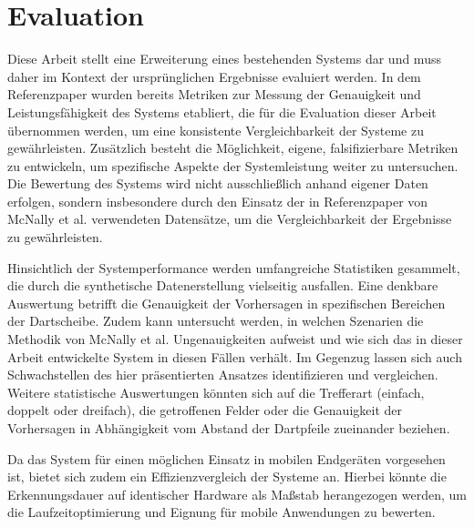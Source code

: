 \section{Evaluation}
\label{sec:evaluation}

Diese Arbeit stellt eine Erweiterung eines bestehenden Systems dar und muss daher im Kontext der ursprünglichen Ergebnisse evaluiert werden. In dem Referenzpaper wurden bereits Metriken zur Messung der Genauigkeit und Leistungsfähigkeit des Systems etabliert, die für die Evaluation dieser Arbeit übernommen werden, um eine konsistente Vergleichbarkeit der Systeme zu gewährleisten. Zusätzlich besteht die Möglichkeit, eigene, falsifizierbare Metriken zu entwickeln, um spezifische Aspekte der Systemleistung weiter zu untersuchen. Die Bewertung des Systems wird nicht ausschließlich anhand eigener Daten erfolgen, sondern insbesondere durch den Einsatz der in Referenzpaper von McNally et al. verwendeten Datensätze, um die Vergleichbarkeit der Ergebnisse zu gewährleisten.

Hinsichtlich der Systemperformance werden umfangreiche Statistiken gesammelt, die durch die synthetische Datenerstellung vielseitig ausfallen. Eine denkbare Auswertung betrifft die Genauigkeit der Vorhersagen in spezifischen Bereichen der Dartscheibe. Zudem kann untersucht werden, in welchen Szenarien die Methodik von McNally et al. Ungenauigkeiten aufweist und wie sich das in dieser Arbeit entwickelte System in diesen Fällen verhält. Im Gegenzug lassen sich auch Schwachstellen des hier präsentierten Ansatzes identifizieren und vergleichen. Weitere statistische Auswertungen könnten sich auf die Trefferart (einfach, doppelt oder dreifach), die getroffenen Felder oder die Genauigkeit der Vorhersagen in Abhängigkeit vom Abstand der Dartpfeile zueinander beziehen.

Da das System für einen möglichen Einsatz in mobilen Endgeräten vorgesehen ist, bietet sich zudem ein Effizienzvergleich der Systeme an. Hierbei könnte die Erkennungsdauer auf identischer Hardware als Maßstab herangezogen werden, um die Laufzeitoptimierung und Eignung für mobile Anwendungen zu bewerten.

